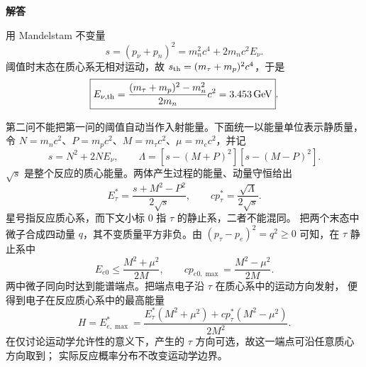 \begin{advsolution}
\begin{center}\begin{minipage}{.96\linewidth}\centering
\raggedright{\bfseries\color{DeepBlue}解答}\par\smallskip\centering

\label{advA6:quality:A6-relativity:a4}
\end{minipage}\end{center}

用 Mandelstam 不变量
\[
 s=(p_\nu+p_n)^2=m_n^2c^4+2m_nc^2E_\nu.
\]
阈值时末态在质心系无相对运动，故
$s_{\rm th}=(m_\tau+m_p)^2c^4$，于是
\[
 \boxed{E_{\nu,\rm th}=
 \frac{(m_\tau+m_p)^2-m_n^2}{2m_n}c^2
 =3.453\,\mathrm{GeV}}.
\]

第二问不能把第一问的阈值自动当作入射能量。下面统一以能量单位表示静质量，
令 $N=m_nc^2$、$P=m_pc^2$、$M=m_\tau c^2$、$\mu=m_ec^2$，并记
\[
 s=N^2+2NE_\nu,\qquad
 \Lambda=[s-(M+P)^2][s-(M-P)^2].
\]
$\sqrt s$ 是整个反应的质心能量。两体产生过程的能量、动量守恒给出
\[
 E_\tau^*=\frac{s+M^2-P^2}{2\sqrt s},\qquad
 cp_\tau^*=\frac{\sqrt\Lambda}{2\sqrt s}.
\]
星号指反应质心系，而下文小标 $0$ 指 $\tau$ 的静止系，二者不能混同。
把两个末态中微子合成四动量 $q$，其不变质量平方非负。由
$(p_\tau-p_e)^2=q^2\ge0$ 可知，在 $\tau$ 静止系中
\[
 E_{e0}\le\frac{M^2+\mu^2}{2M},\qquad
 cp_{e0,\max}=\frac{M^2-\mu^2}{2M}.
\]
两中微子同向时达到能谱端点。把端点电子沿 $\tau$ 在质心系中的运动方向发射，
便得到电子在反应质心系中的最高能量
\[
 H=E_{e,\max}^*
 =\frac{E_\tau^*(M^2+\mu^2)+cp_\tau^*(M^2-\mu^2)}{2M^2}.
\]
在仅讨论运动学允许性的意义下，产生的 $\tau$ 方向可选，故这一端点可沿任意质心方向取到；
实际反应概率分布不改变运动学边界。


\end{advsolution}
